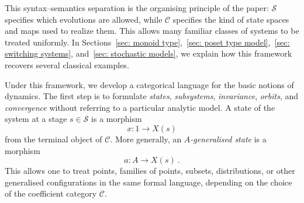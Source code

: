 \documentclass[a4paper,reqno,oneside]{amsart}
\theoremstyle{definition}
\theoremstyle{remark}
\numberwithin{equation}{section}
\begin{document}
This syntax--semantics separation is the organising principle of the paper:
$\mathcal S$ specifies which evolutions are allowed, while $\mathcal C$
specifies the kind of state spaces and maps used to realize them. This allows many familiar classes of systems to
be treated uniformly. In Sections~\ref{sec: monoid type},~\ref{sec: poset type model},~\ref{sec: switching systems}, and~\ref{sec: stochastic models}, we explain
how this framework recovers several classical examples.


\medskip


Under this framework, we develop a categorical language for the basic notions
of dynamics. The first step is to formulate \textit{states}, \textit{subsystems}, \textit{invariance},
\textit{orbits}, and \textit{convergence} without referring to a particular analytic model. A state of the system at a stage $s\in\mathcal S$ is a morphism
\begin{equation}
    x\colon 1\to X(s)
\end{equation}
from the terminal object of $\mathcal C$. More generally, an
\textit{$A$-generalised state} is a morphism
\begin{equation}
    a\colon A\to X(s) \ .
\end{equation}
This allows one to treat points, families of points, subsets, distributions,
or other generalised configurations in the same formal language, depending
on the choice of the coefficient category $\mathcal C$.
\end{document}

